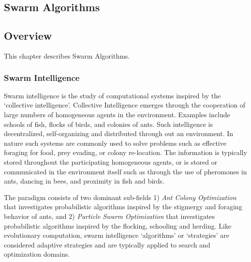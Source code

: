 

\renewcommand{\bibsection}{\subsection{\bibname}}
\begin{bibunit}

\chapter{Swarm Algorithms}
\label{ch:swarm}

\section{Overview}
This chapter describes Swarm Algorithms.

\subsection{Swarm Intelligence}
Swarm intelligence is the study of computational systems inspired by the `collective intelligence'. Collective Intelligence emerges through the cooperation of large numbers of homogeneous agents in the environment. Examples include schools of fish, flocks of birds, and colonies of ants. Such intelligence is decentralized, self-organizing and distributed through out an environment. In nature such systems are commonly used to solve problems such as effective foraging for food, prey evading, or colony re-location. The information is typically stored throughout the participating homogeneous agents, or is stored or communicated in the environment itself such as through the use of pheromones in ants, dancing in bees, and proximity in fish and birds.

The paradigm consists of two dominant sub-fields 1) \emph{Ant Colony Optimization} that investigates probabilistic algorithms inspired by the stigmergy and foraging behavior of ants, and 2) \emph{Particle Swarm Optimization} that investigates probabilistic algorithms inspired by the flocking, schooling and herding. Like evolutionary computation, swarm intelligence `algorithms' or `strategies' are considered adaptive strategies and are typically applied to search and optimization domains.


\end{bibunit}
